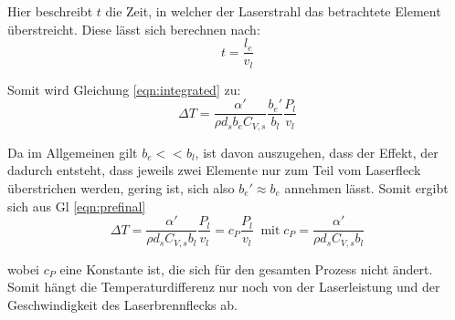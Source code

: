 Hier beschreibt $t$ die Zeit, in welcher der Laserstrahl das betrachtete Element über\-streicht. Diese lässt sich berechnen nach:
\begin{equation}
  t = \frac{l_e}{v_l}
  \label{eqn:elementtime}
\end{equation}

Somit wird Gleichung \ref{eqn:integrated} zu:
\begin{equation}
  \Delta T = \frac{\alpha'}{\rho d_s b_e C_{V,s}} \frac{b_e'}{b_l} \frac{P_l}{v_l}
  \label{eqn:prefinal}
\end{equation}

Da im Allgemeinen gilt $b_e << b_l$, ist davon auszugehen, dass der Effekt, der dadurch entsteht, dass jeweils zwei Elemente nur zum Teil vom Laserfleck überstrichen werden, gering ist, sich also $b_e' \approx b_e$ annehmen lässt. Somit ergibt sich aus Gl \ref{eqn:prefinal}
\begin{equation}
  \Delta T = \frac{\alpha'}{\rho d_s C_{V,s}b_l} \frac{P_l}{v_l} = c_P \frac{P_l}{v_l}\;\;\mbox{mit}\; c_P = \frac{\alpha'}{\rho d_s C_{V,s}b_l}
  \label{eqn:final} 
\end{equation}

wobei $c_P$ eine Konstante ist, die sich für den gesamten Prozess nicht ändert. Somit hängt die Temperaturdifferenz nur noch von der Laserleistung und der Geschwindigkeit des Laserbrennflecks ab.
\label{sec:heattheory}
